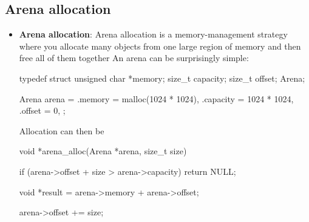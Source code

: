 \documentclass{report}
\begin{document}
        \pagebreak 
        \subsection{Arena allocation}
        \begin{itemize}
            \item \textbf{Arena allocation}: Arena allocation is a memory-management strategy where you allocate many objects from one large region of memory and then free all of them together
                \bigbreak \noindent 
                An arena can be surprisingly simple:
                \bigbreak \noindent 
                \begin{cppcode}
                    typedef struct {
                        unsigned char *memory;
                        size_t capacity;
                        size_t offset;
                    } Arena;
                \end{cppcode}
                \bigbreak \noindent 
                \begin{cppcode}
                    Arena arena = {
                        .memory = malloc(1024 * 1024),
                        .capacity = 1024 * 1024,
                        .offset = 0,
                    };
                \end{cppcode}
                \bigbreak \noindent 
                Allocation can then be 
                \bigbreak \noindent 
                \begin{cppcode}
                void *arena_alloc(Arena *arena, size_t size) {
                    if (arena->offset + size > arena->capacity)
                        return NULL;

                    void *result = arena->memory + arena->offset;

                    arena->offset += size;

}
\end{cppcode}
\end{itemize}
\end{document}
